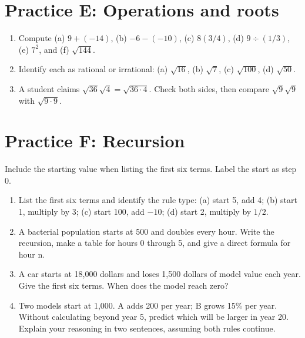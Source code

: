 \documentclass[12pt,letterpaper]{article}
\begin{document}
\section*{Practice E: Operations and roots}
\begin{enumerate}[label=E\arabic*.,leftmargin=2.5em,itemsep=10pt]
\item Compute (a) $9+(-14)$, (b) $-6-(-10)$, (c) $8(3/4)$, (d) $9\div(1/3)$, (e) $7^2$, and (f) $\sqrt{144}$.
\item Identify each as rational or irrational: (a) $\sqrt{16}$, (b) $\sqrt7$, (c) $\sqrt{100}$, (d) $\sqrt{50}$.
\item A student claims $\sqrt{36}\sqrt4=\sqrt{36\cdot4}$. Check both sides, then compare $\sqrt9\sqrt9$ with $\sqrt{9\cdot9}$.
\end{enumerate}
\section*{Practice F: Recursion}
Include the starting value when listing the first six terms. Label the start as step 0.
\begin{enumerate}[label=F\arabic*.,leftmargin=2.5em,itemsep=10pt]
\item List the first six terms and identify the rule type: (a) start 5, add 4; (b) start 1, multiply by 3; (c) start 100, add $-10$; (d) start 2, multiply by $1/2$.
\item A bacterial population starts at 500 and doubles every hour. Write the recursion, make a table for hours 0 through 5, and give a direct formula for hour n.
\item A car starts at 18,000 dollars and loses 1,500 dollars of model value each year. Give the first six terms. When does the model reach zero?
\item Two models start at 1,000. A adds 200 per year; B grows 15\% per year. Without calculating beyond year 5, predict which will be larger in year 20. Explain your reasoning in two sentences, assuming both rules continue.
\end{enumerate}
\end{document}
